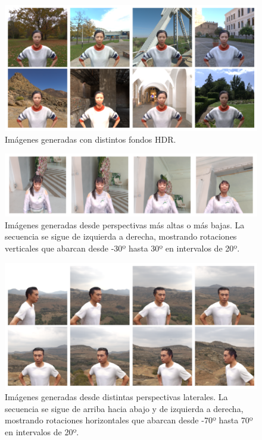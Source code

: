 \begin{figure}[h]
	\centering
	\includegraphics[scale=0.4]{imagenes/cap4/imagenes_fondos.png}
	\caption[Ejemplos de imágenes con diferentes fondos.]{Imágenes generadas con distintos fondos HDR.}
	\label{fig21.2}
\end{figure}

\begin{figure}[h]
	\centering
	\includegraphics[scale=0.4]{imagenes/cap4/imagenes_rotacion_vertical2.png}
	\caption[Ejemplos de imágenes rotadas verticalmente.]{Imágenes generadas desde perspectivas más altas o más bajas. La secuencia se sigue de izquierda a derecha, mostrando rotaciones verticales que abarcan desde -30º hasta 30º en intervalos de 20º.}
	\label{fig22}
\end{figure}

\begin{figure}[h]
	\centering
	\includegraphics[scale=0.4]{imagenes/cap4/imagenes_rotacion_horizontal2.png}
	\caption[Ejemplos de imágenes rotadas horizontalmente.]{Imágenes generadas desde distintas perspectivas laterales. La secuencia se sigue de arriba hacia abajo y de izquierda a derecha, mostrando rotaciones horizontales que abarcan desde -70º hasta 70º en intervalos de 20º.}
	\label{fig23}
\end{figure}

